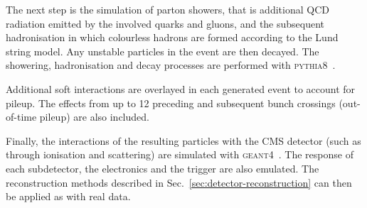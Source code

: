 The next step is the simulation of parton showers, that is additional QCD 
radiation emitted by the involved quarks and gluons, and the subsequent 
hadronisation in which colourless hadrons are formed according to the Lund 
string model. Any unstable particles in the event are then decayed. The 
showering, hadronisation and decay processes are performed with 
\textsc{pythia8}~\cite{pythia}.


Additional soft interactions are overlayed in each generated event to account 
for pileup. The effects from up to 12 preceding and subsequent bunch crossings 
(out-of-time pileup) are also included.

Finally, the interactions of the resulting particles with the CMS detector 
(such as through ionisation and scattering) are simulated with 
\textsc{geant4}~\cite{geant}. The response of each subdetector, the electronics 
and the trigger are also emulated. The reconstruction methods described in 
Sec.~\ref{sec:detector-reconstruction} can then be applied as with real data.

